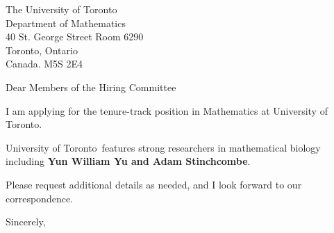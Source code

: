 




	
	
	\def\School{University of Toronto}
	
	\begin{letter}
		{The University of Toronto\\
			Department of Mathematics\\
			40 St. George Street Room 6290\\
			Toronto, Ontario\\
			Canada. M5S 2E4
		}
		
		\opening{Dear Members of the Hiring Committee}
		
		
		I am applying for the tenure-track position in Mathematics at \School. 
		
		
		
		\School~features strong researchers in mathematical biology including \textbf{Yun William Yu and Adam Stinchcombe}. 
		
		
		
		
		
		Please request additional details as needed, and I look forward to our correspondence.
		
		\closing{Sincerely,}
	\end{letter}
